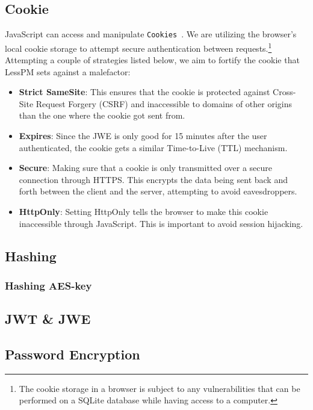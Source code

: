 \subsection{Cookie}\label{subsec:cookie}
JavaScript can access and manipulate \texttt{Cookies}~\cite{he2019malicious}.
We are utilizing the browser's local cookie storage to attempt secure
authentication between requests.\footnote{
  The cookie storage in a browser is subject to any vulnerabilities that can
  be performed on a SQLite database while having access to a computer.
}
Attempting a couple of strategies listed below, we aim to fortify the cookie
that LessPM sets against a malefactor:
\begin{itemize}
  \item \textbf{Strict SameSite}:
  This ensures that the cookie is protected against Cross-Site Request
  Forgery (CSRF) and inaccessible to domains of other origins than the one
  where the cookie got sent from.
  \item \textbf{Expires}:
  Since the JWE is only good for 15 minutes after the user authenticated, the
  cookie gets a similar Time-to-Live (TTL) mechanism.
  \item \textbf{Secure}:
  Making sure that a cookie is only transmitted over a secure connection
  through HTTPS\@.
  This encrypts the data being sent back and forth between the client and
  the server, attempting to avoid eavesdroppers.
  \item \textbf{HttpOnly}:
  Setting HttpOnly tells the browser to make this cookie inaccessible through
  JavaScript.
  This is important to avoid session hijacking.
\end{itemize}


\subsection{Hashing}\label{subsec:hashing}

\subsubsection{Hashing AES-key}\label{subsubsec:hashing-aes-key}


\subsection{JWT \& JWE}\label{subsec:jwt}

\subsection{Password Encryption}\label{subsec:password-encryption}


